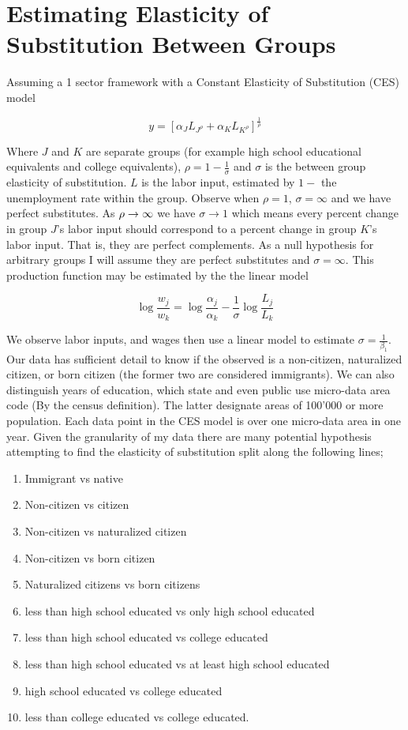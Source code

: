 \documentclass[11pt]{article}
\theoremstyle{definition}
\theoremstyle{remark}
\def\a{\alpha}
\def\b{\beta}
\def\r{\rho}
\def\s{\sigma}
\begin{document}
\section{Estimating Elasticity of Substitution Between Groups}

Assuming a 1 sector framework with a Constant Elasticity of Substitution (CES)
model

\begin{equation}
    y = [\a_J L_{J^\r} + \a_K L_{K^\r}]^{\frac 1\r}
\end{equation}

Where $J$ and $K$ are separate groups (for example high school educational
equivalents and college equivalents), $\r = 1-\frac1\s$ and $\s$ is the
between group elasticity of substitution.
$L$ is the labor input, estimated by $1-$ the unemployment rate within the group.
Observe when $\r = 1$, $\s = \infty$ and we have perfect substitutes. As
$\r\to\-\infty$ we have $\s \to 1$ which means every percent change in group $J$'s
labor input should correspond to a percent change in group $K$'s labor input.
That is, they are perfect complements. As a null hypothesis for arbitrary groups
I will assume they are perfect substitutes and $\s = \infty$.
This production function may be estimated by the the linear model

\begin{equation}
    \log \frac{w_j}{w_k} = \log\frac{\a_j}{\a_k} - \frac 1\s \log\frac{L_j}{L_k}
\end{equation}

We observe labor inputs, and wages then use a linear model to estimate
$\s = \frac 1{\b_1}$. Our data has sufficient detail to know if the observed
is a non-citizen, naturalized citizen, or born citizen (the former two are
considered immigrants). We can also distinguish years of education, which state
and even public use micro-data area code (By the census definition).
The latter designate areas of 100'000 or more population.
Each data point in the CES model is over one micro-data area in one year.
Given the granularity of my data there are many potential hypothesis attempting
to find the elasticity of
substitution split along the following lines;

\begin{enumerate}
    \item Immigrant vs native
    \item Non-citizen vs citizen
    \item Non-citizen vs naturalized citizen
    \item Non-citizen vs born citizen
    \item Naturalized citizens vs born citizens
    \item less than high school educated vs only high school educated
    \item less than high school educated vs college educated
    \item less than high school educated vs at least high school educated
    \item high school educated vs college educated
    \item less than college educated vs college educated.
\end{enumerate}
\end{document}
